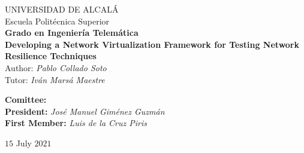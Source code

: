 \begin{center}
    {\Huge UNIVERSIDAD DE ALCALÁ}\\
    \vspace{0.5cm}
    {\huge Escuela Politécnica Superior}\\
    \vspace{1.5cm}
    {\Large \textbf{Grado en Ingeniería Telemática}}\\
    \vspace{3cm}
    {\Large \textbf{Developing a Network Virtualization Framework for Testing Network Resilience Techniques}}\\
    \vspace{1.5cm}
    {\large Author: \textit{Pablo Collado Soto}}\\
    \vspace{2.5mm}
    {\large Tutor: \textit{Iván Marsá Maestre}}\\
    \vspace{2cm}
\end{center}

\begin{flushleft}
    {\large \textbf{Comittee:}}\\
    \vspace{1cm}
    {\large \hspace{2cm} \textbf{President:} \hspace{9mm} \textit{José Manuel Giménez Guzmán}}\\
    \vspace{0.5cm}
    {\large \hspace{2cm} \textbf{First Member:} \textit{Luis de la Cruz Piris}}\\
    \vspace{7cm}
\end{flushleft}

\begin{center}
    $15$ July $2021$
\end{center}

\clearpage
